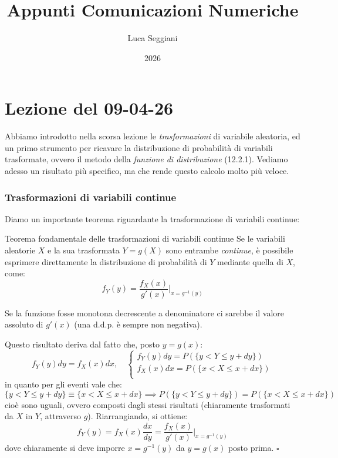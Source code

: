 \documentclass[a4paper,11pt]{article}
\title{Appunti Comunicazioni Numeriche}
\author{Luca Seggiani}
\date{2026}
\begin{document}
\section{Lezione del 09-04-26}

\thispagestyle{empty}
\pagestyle{fancy}

Abbiamo introdotto nella scorsa lezione le \textit{trasformazioni} di variabile aleatoria, ed un primo strumento per ricavare la distribuzione di probabilità di variabili trasformate, ovvero il metodo della \textit{funzione di distribuzione} (12.2.1). Vediamo adesso un risultato più specifico, ma che rende questo calcolo molto più veloce.

\subsubsection{Trasformazioni di variabili continue}
Diamo un importante teorema riguardante la trasformazione di variabili continue:
\begin{theorem}{Teorema fondamentale delle trasformazioni di variabili continue}
	Se le variabili aleatorie $X$ e la sua trasformata $Y = g(X)$ sono entrambe \textit{continue}, è possibile esprimere direttamente la distribuzione di probabilità di $Y$ mediante quella di $X$, come:
$$
f_Y (y) = \frac{f_X (x)}{g'(x)} \Bigg|_{x = g^{-1}(y)}
$$
\end{theorem}
Se la funzione fosse monotona decrescente a denominatore ci sarebbe il valore assoluto di $g'(x)$ (una d.d.p. è sempre non negativa).

Questo risultato deriva dal fatto che, posto $y = g(x)$:
$$
f_Y (y) dy = f_X (x) dx, \quad
\begin{cases}
f_Y (y) dy = P\left( \{ y < Y \leq y + dy \} \right) \\
f_X (x) dx = P\left( \{ x < X \leq x + dx \} \right) \\
\end{cases}
$$
in quanto per gli eventi vale che:
$$
\{ y < Y \leq y + dy \} \equiv \{ x < X \leq x + dx \} \implies
P\left( \{ y < Y \leq y + dy \} \right) = P\left( \{ x < X \leq x + dx \} \right)
$$
cioè sono uguali, ovvero composti dagli stessi risultati (chiaramente trasformati da $X$ in $Y$, attraverso $g$).
Riarrangiando, si ottiene:
$$
f_Y (y) = f_X (x) \frac{dx}{dy} = \frac{f_X (x)}{g'(x)} \Bigg|_{x = g^{-1}(y)}
$$
dove chiaramente si deve imporre $x = g^{-1}(y)$ da $y = g(x)$ posto prima. \hfill $\square$
\end{document}
